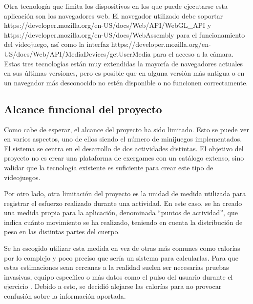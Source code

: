

Otra tecnología que limita los dispositivos en los que puede ejecutarse esta aplicación son
los navegadores web. El navegador utilizado debe soportar %
{https://developer.mozilla.org/en-US/docs/Web/API/WebGL_API} y %
{https://developer.mozilla.org/en-US/docs/WebAssembly} para el funcionamiento del videojuego, así
como la interfaz %
{https://developer.mozilla.org/en-US/docs/Web/API/MediaDevices/getUserMedia} para el acceso a la
cámara. Estas tres tecnologías están muy extendidas la mayoría de navegadores actuales en sus
últimas versiones, pero es posible que en alguna versión más antigua o en un navegador más
desconocido no estén disponible o no funcionen correctamente.

\subsection{Alcance funcional del proyecto}
Como cabe de esperar, el alcance del proyecto ha sido limitado. Esto se puede ver en varios
aspectos, uno de ellos siendo el número de minijuegos implementados. El sistema se centra en el
desarrollo de dos actividades distintas. El objetivo del proyecto no es crear una plataforma de
\glspl{exergame} con un catálogo extenso, sino validar que la tecnología existente es suficiente
para crear este tipo de videojuegos.

Por otro lado, otra limitación del proyecto es la unidad de medida utilizada para registrar
el esfuerzo realizado durante una actividad. En este caso, se ha creado una medida propia para
la aplicación, denominada \enquote{puntos de actividad}, que indica cuánto movimiento se ha
realizado, teniendo en cuenta la distribución de peso en las distintas partes del cuerpo.

Se ha escogido utilizar esta medida en vez de otras más comunes como calorías por lo complejo
y poco preciso que sería un sistema para calcularlas. Para que estas estimaciones sean cercanas
a la realidad suelen ser necesarias pruebas invasivas, equipo específico o más datos como el
pulso del usuario durante el ejercicio \parencite{nonInvasiveCalories}. Debido a esto, se
decidió alejarse las calorías para no provocar confusión sobre la información aportada.

